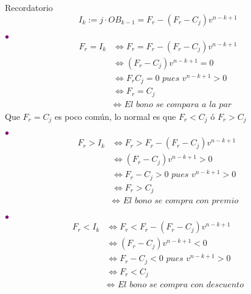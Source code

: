 Recordatorio
$$I_k := j\cdot OB_{k-1} = F_r - (F_r - C_j)v^{n-k+1}$$

\textcolor{purple}{$\bullet$} \begin{align*}
    F_r = I_k &\iff F_r =F_r - (F_r-C_j)v^{n-k+1}\\
    &\iff (F_r-C_j)v^{n-k+1} =0\\
    &\iff F_rC_j = 0 \textit{ pues } v^{n-k+1}>0\\
    &\iff F_r=C_j\\
    &\iff \textit{ El bono se compara a la par}
\end{align*}
Que $F_r=C_j$ es poco común, lo normal es que $F_r<C_j$ ó $F_r>C_j$

\textcolor{purple}{$\bullet$} \begin{align*}
    F_r>I_k &\iff F_r> F_r - (F_r-C_j)v^{n-k+1}\\
    &\iff (F_r-C_j)v^{n-k+1} >0\\
    &\iff F_r-C_j>0 \textit{ pues }v^{n-k+1}>0\\
    &\iff F_r>C_j\\
    &\iff \textit{ El bono se compra con premio}
\end{align*}

\textcolor{purple}{$\bullet$} \begin{align*}
    F_r<I_k &\iff F_r< F_r - (F_r-C_j)v^{n-k+1}\\
    &\iff (F_r-C_j)v^{n-k+1} <0\\
    &\iff F_r-C_j<0 \textit{ pues }v^{n-k+1}>0\\
    &\iff F_r<C_j\\
    &\iff \textit{ El bono se compra con descuento}
\end{align*}

